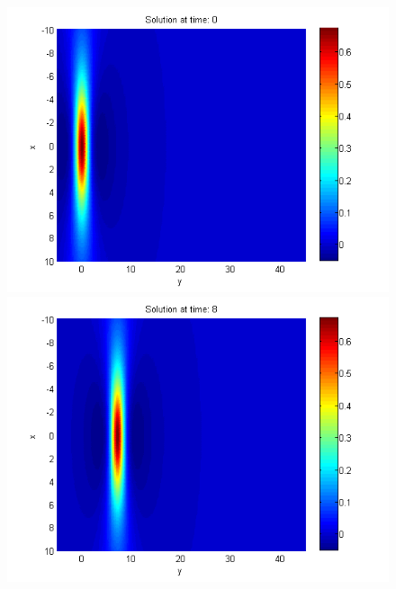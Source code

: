 \documentclass[11pt,a4paper,twoside]{article}
\begin{document}
\begin{figure}[!htbp]
	\centering
	\begin{minipage}[b]{0.31\linewidth}
		\includegraphics[width=\linewidth]{Pictures/Solution1_t=0.png}
	\end{minipage}	
	\begin{minipage}[b]{0.31\linewidth}
		\includegraphics[width=\linewidth]{Pictures/Solution1_t=8.png}
	\end{minipage}	
	\begin{minipage}[b]{0.31\linewidth}

\end{minipage}
\end{figure}
\end{document}
